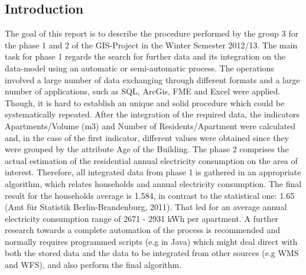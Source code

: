 
\subsection{Introduction}
The goal of this report is to describe the procedure performed by the group 3 for the phase 1 and 2 of the GIS-Project in the Winter Semester 2012/13.
The main task for phase 1 regards the search for further data and its integration on the data-model using an automatic or semi-automatic process. The operations involved a large number of data exchanging through different formats and a large number of  applications, such as SQL, ArcGis, FME and Excel were applied. Though, it is hard to establish an unique and solid procedure which could be systematically repeated.
After the integration of the required data, the indicators Apartments/Volume (m3) and Number of Residents/Apartment were calculated and, in the case of the first indicator, different values were obtained since they were grouped by the attribute Age of the Building.
The phase 2 comprises the actual estimation of the residential annual electricity consumption on the area of interest. Therefore, all integrated data from phase 1 is gathered in an appropriate algorithm, which relates households and annual electricity consumption.
The final result for the households average is 1.584, in contrast to the statistical one: 1.65 (Amt für Statistik Berlin-Brandenburg, 2011). That led for an average annual electricity consumption range of 2671 - 2931 kWh per apartment.
A further research towards a complete automation of the process is recommended and normally requires programmed scripts (e.g in Java) which might deal direct with both the stored data and the data to be integrated from other sources (e.g WMS and WFS), and also perform the final algorithm.
